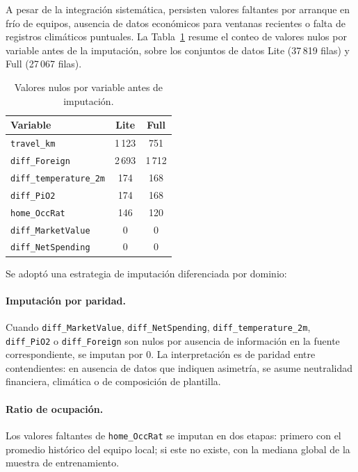 A pesar de la integraci\'on sistem\'atica, persisten valores faltantes por arranque en fr\'io de equipos, ausencia de datos econ\'omicos para ventanas recientes o falta de registros clim\'aticos puntuales. La Tabla~\ref{tab:nulos} resume el conteo de valores nulos por variable antes de la imputaci\'on, sobre los conjuntos de datos Lite (37\,819 filas) y Full (27\,067 filas).

\begin{table}[htbp]
	\centering
	\caption{Valores nulos por variable antes de imputaci\'on.}
	\label{tab:nulos}
	\begin{tabular}{lcc}
		\toprule
		\textbf{Variable} & \textbf{Lite} & \textbf{Full} \\
		\midrule
		\texttt{travel\_km} & 1\,123 & 751 \\
		\texttt{diff\_Foreign} & 2\,693 & 1\,712 \\
		\texttt{diff\_temperature\_2m} & 174 & 168 \\
		\texttt{diff\_PiO2} & 174 & 168 \\
		\texttt{home\_OccRat} & 146 & 120 \\
		\texttt{diff\_MarketValue} & 0 & 0 \\
		\texttt{diff\_NetSpending} & 0 & 0 \\
		\bottomrule
	\end{tabular}
\end{table}

Se adopt\'o una estrategia de imputaci\'on diferenciada por dominio:

\paragraph{Imputaci\'on por paridad.} Cuando \texttt{diff\_MarketValue}, \texttt{diff\_NetSpending}, \texttt{diff\_temperature\_2m}, \texttt{diff\_PiO2} o \texttt{diff\_Foreign} son nulos por ausencia de informaci\'on en la fuente correspondiente, se imputan por $0$. La interpretaci\'on es de paridad entre contendientes: en ausencia de datos que indiquen asimetr\'ia, se asume neutralidad financiera, clim\'atica o de composici\'on de plantilla.

\paragraph{Ratio de ocupaci\'on.} Los valores faltantes de \texttt{home\_OccRat} se imputan en dos etapas: primero con el promedio hist\'orico del equipo local; si este no existe, con la mediana global de la muestra de entrenamiento.

